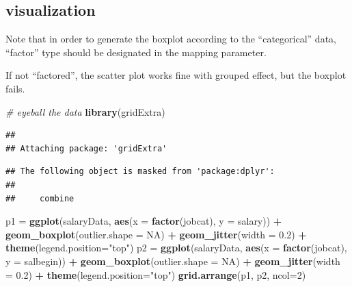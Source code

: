 \documentclass[
]{ctexart}
\newenvironment{Shaded}{\begin{snugshade}}{\end{snugshade}}
\newcommand{\AttributeTok}[1]{\textcolor[rgb]{0.13,0.29,0.53}{#1}}
\newcommand{\CommentTok}[1]{\textcolor[rgb]{0.56,0.35,0.01}{\textit{#1}}}
\newcommand{\ConstantTok}[1]{\textcolor[rgb]{0.56,0.35,0.01}{#1}}
\newcommand{\DecValTok}[1]{\textcolor[rgb]{0.00,0.00,0.81}{#1}}
\newcommand{\FloatTok}[1]{\textcolor[rgb]{0.00,0.00,0.81}{#1}}
\newcommand{\FunctionTok}[1]{\textcolor[rgb]{0.13,0.29,0.53}{\textbf{#1}}}
\newcommand{\NormalTok}[1]{#1}
\newcommand{\OtherTok}[1]{\textcolor[rgb]{0.56,0.35,0.01}{#1}}
\newcommand{\SpecialCharTok}[1]{\textcolor[rgb]{0.81,0.36,0.00}{\textbf{#1}}}
\newcommand{\StringTok}[1]{\textcolor[rgb]{0.31,0.60,0.02}{#1}}
\begin{document}
\hypertarget{visualization-1}{%
\subsection{visualization}\label{visualization-1}}

Note that in order to generate the boxplot according to the
``categorical'' data, ``factor'' type should be designated in the
mapping parameter.

If not ``factored'', the scatter plot works fine with grouped effect,
but the boxplot fails.

\begin{Shaded}
\begin{Highlighting}[]
\CommentTok{\# eyeball the data}
\FunctionTok{library}\NormalTok{(gridExtra)}
\end{Highlighting}
\end{Shaded}

\begin{verbatim}
## 
## Attaching package: 'gridExtra'
\end{verbatim}

\begin{verbatim}
## The following object is masked from 'package:dplyr':
## 
##     combine
\end{verbatim}

\begin{Shaded}
\begin{Highlighting}[]
\NormalTok{p1 }\OtherTok{=} \FunctionTok{ggplot}\NormalTok{(salaryData, }\FunctionTok{aes}\NormalTok{(}\AttributeTok{x =} \FunctionTok{factor}\NormalTok{(jobcat), }\AttributeTok{y =}\NormalTok{ salary)) }\SpecialCharTok{+} 
  \FunctionTok{geom\_boxplot}\NormalTok{(}\AttributeTok{outlier.shape =} \ConstantTok{NA}\NormalTok{) }\SpecialCharTok{+} \FunctionTok{geom\_jitter}\NormalTok{(}\AttributeTok{width =} \FloatTok{0.2}\NormalTok{) }\SpecialCharTok{+} 
  \FunctionTok{theme}\NormalTok{(}\AttributeTok{legend.position=}\StringTok{"top"}\NormalTok{)}
\NormalTok{p2 }\OtherTok{=} \FunctionTok{ggplot}\NormalTok{(salaryData, }\FunctionTok{aes}\NormalTok{(}\AttributeTok{x =} \FunctionTok{factor}\NormalTok{(jobcat), }\AttributeTok{y =}\NormalTok{ salbegin)) }\SpecialCharTok{+} 
  \FunctionTok{geom\_boxplot}\NormalTok{(}\AttributeTok{outlier.shape =} \ConstantTok{NA}\NormalTok{) }\SpecialCharTok{+} \FunctionTok{geom\_jitter}\NormalTok{(}\AttributeTok{width =} \FloatTok{0.2}\NormalTok{) }\SpecialCharTok{+} 
  \FunctionTok{theme}\NormalTok{(}\AttributeTok{legend.position=}\StringTok{"top"}\NormalTok{)}
\FunctionTok{grid.arrange}\NormalTok{(p1, p2, }\AttributeTok{ncol=}\DecValTok{2}\NormalTok{)}
\end{Highlighting}
\end{Shaded}
\end{document}
